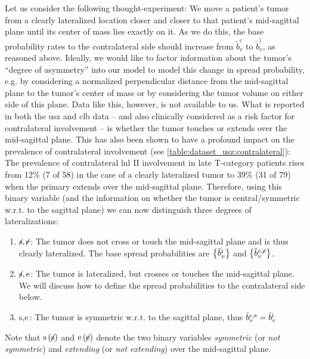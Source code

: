 \documentclass[\relativeRoot/main.tex]{subfiles}
\begin{document}
Let us consider the following thought-experiment: We move a patient's tumor from a clearly lateralized location closer and closer to that patient's mid-sagittal plane until its center of mass lies exactly on it. As we do this, the base probability rates to the contralateral side should increase from $\tilde{b}_v^\text{c}$ to $\tilde{b}_v^\text{i}$, as reasoned above. Ideally, we would like to factor information about the tumor's ``degree of asymmetry'' into our model to model this change in spread probability, e.g. by considering a normalized perpendicular distance from the mid-sagittal plane to the tumor's center of mass or by considering the tumor volume on either side of this plane. Data like this, however, is not available to us. What is reported in both the \gls{usz} and \gls{clb} data -- and also clinically considered as a risk factor for contralateral involvement -- is whether the tumor touches or extends over the mid-sagittal plane. This has also been shown to have a profound impact on the prevalence of contralateral involvement (see \cref{table:dataset_usz:contralateral}): The prevalence of contralateral \gls{lnl} II involvement in late T-category patients rises from 12\% (7 of 58) in the case of a clearly lateralized tumor to 39\% (31 of 79) when the primary extends over the mid-sagittal plane. Therefore, using this binary variable (and the information on whether the tumor is central/symmetric w.r.t. to the sagittal plane) we can now distinguish three degrees of lateralizations:

\begin{enumerate}
    \item $\centernot{\text{s}} , \centernot{\text{e}}$: The tumor does not cross or touch the mid-sagittal plane and is thus clearly lateralized. The base spread probabilities are $\big\{ \Tilde{b}_v^\text{i} \big\}$ and $\big\{ \Tilde{b}_v^{\text{c},\centernot{\text{e}}} \big\}$.
    \item $\centernot{\text{s}} , \text{e}$: The tumor is lateralized, but crosses or touches the mid-sagittal plane. We will discuss how to define the spread probabilities to the contralateral side below.
    \item $\text{s} , \text{e}$: The tumor is symmetric w.r.t. to the sagittal plane, thus $\Tilde{b}_v^{\text{c},\text{s}} = \Tilde{b}_v^\text{i}$
\end{enumerate}

Note that $\text{s} \, (\centernot{\text{s}})$ and $\text{e} \, (\centernot{\text{e}})$ denote the two binary variables \emph{symmetric} (or \emph{not symmetric}) and \emph{extending} (or \emph{not extending}) over the mid-sagittal plane.
\end{document}

